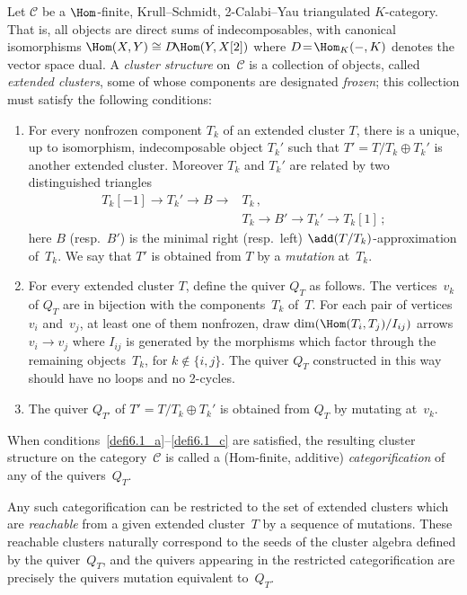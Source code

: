 \begin{definition}
\label{def:BIRSc}
Let $\mathcal C$ be a $\Hom$-finite, Krull--Schmidt, 2-Calabi--Yau triangulated $K$-category. 
That is, all objects are direct sums of indecomposables, with canonical isomorphisms 
$\Hom(X,Y)\cong D\!\Hom (Y,X[2])$
where $D\!=\!\Hom _K(-,K)$ denotes the vector space dual. 
A \emph{cluster structure} on~$\mathcal C$ is a collection of 
objects, called \emph{extended clusters}, some of whose components are designated \emph{frozen}; this collection must satisfy the following conditions:

\begin{enumerate}[label=(\alph*)]
\item\label{defi6.1_a} 
For every nonfrozen component $T_k$ of an extended cluster $T$, there is a unique, up to isomorphism, indecomposable object $T_k'$ such that $T'=T/T_k\oplus T_k'$ is another extended cluster. 
Moreover $T_k$ and $T_k'$ are related by two distinguished triangles
\[
\begin{aligned}
T_k[-1]\to T_k'\to B\to &T_k \,, \\
&T_k\to B'\to T_k'\to T_k[1] \,;
\end{aligned}
\]
here $B$ (resp.~$B'$) is the minimal right (resp.~left) $\add (T/T_k)$-approximation of~$T_k$.
We say that $T'$ is obtained from $T$ by a \emph{mutation} at~$T_k$. 


\item\label{defi6.1_b} 
For every extended cluster $T$, define the quiver $Q_T$ as follows. 
The vertices~$v_k$ of $Q_T$ are in bijection with the components~$T_k$ of~$T$.
For each pair of vertices $v_i$ and~$v_j$, 
at least one of them nonfrozen, 
draw $\dim(\Hom(T_i,T_j)/I_{ij})$ arrows $v_i\to v_j$
where $I_{ij}$ is generated by the morphisms which factor through the remaining objects~$T_k$,
for $k\notin\{i,j\}$. 
The quiver $Q_T$ constructed in this way should have no loops and no 2-cycles. 

\item\label{defi6.1_c} 
The quiver $Q_{T'}$ of $T'=T/T_k\oplus T_k'$ is obtained from $Q_T$ by mutating at~$v_k$.
\end{enumerate}
When conditions~\ref{defi6.1_a}--\ref{defi6.1_c} are satisfied, the resulting cluster structure on the category~$\mathcal{C}$
is called a (Hom-finite, additive) \emph{categorification} of any of the quivers~$Q_T$.

Any such categorification can be restricted to the set of extended clusters which are \emph{reachable} from a given extended cluster~$T$ by a sequence of mutations. 
These reachable clusters naturally correspond to the seeds of the cluster algebra defined by the quiver~$Q_T$, and 
the quivers appearing in the restricted categorification 
are precisely the quivers mutation equivalent to~$Q_T$. 
\end{definition}

